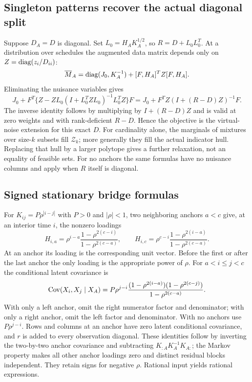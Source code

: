 \subsection{Singleton patterns recover the actual diagonal split}
Suppose $D_A=D$ is diagonal. Set $L_0=H_AK_A^{1/2}$, so
$R=D+L_0L_0^T$. At a distribution over schedules the augmented data
matrix depends only on $Z=\operatorname{diag}(z_i/D_{ii})$:
\[
 \overline M_A=\operatorname{diag}(J_0,K_A^{-1})+[F,H_A]^TZ[F,H_A].
\]
Eliminating the nuisance variables gives
\[
 J_0+F^T\{Z-ZL_0(I+L_0^TZL_0)^{-1}L_0^TZ\}F
 =J_0+F^TZ(I+(R-D)Z)^{-1}F.
\]
The inverse identity follows by multiplying by $I+(R-D)Z$ and is valid
at zero weights and with rank-deficient $R-D$. Hence the objective is the
virtual-noise extension for this exact $D$. For cardinality alone, the
marginals of mixtures over size-$k$ subsets fill $\mathcal Z_k$; more generally
they fill the actual indicator hull. Replacing that hull by a larger
polytope gives a further relaxation, not an equality of feasible sets.
For no anchors the same formulas have no nuisance columns and apply when
$R$ itself is diagonal.

\subsection{Signed stationary bridge formulas}
\label{app:stationary-bridges}
For $K_{ij}=P\rho^{|i-j|}$ with $P>0$ and $|\rho|<1$, two neighboring
anchors $a<c$ give, at an interior time $i$, the nonzero loadings
\begin{equation}\label{eq:bridge-loadings}
 H_{i,a}=\rho^{i-a}\frac{1-\rho^{2(c-i)}}{1-\rho^{2(c-a)}},\qquad
 H_{i,c}=\rho^{c-i}\frac{1-\rho^{2(i-a)}}{1-\rho^{2(c-a)}}.
\end{equation}
At an anchor its loading is the corresponding unit vector. Before the first
or after the last anchor the only loading is the appropriate power of
$\rho$. For $a<i\le j<c$ the conditional latent covariance is
\begin{equation}\label{eq:bridge-covariance}
 \operatorname{Cov}(X_i,X_j\mid X_A)
 =P\rho^{j-i}
 \frac{(1-\rho^{2(i-a)})(1-\rho^{2(c-j)})}{1-\rho^{2(c-a)}}.
\end{equation}
With only a left anchor, omit the right numerator factor and denominator;
with only a right anchor, omit the left factor and denominator. With no
anchors use $P\rho^{j-i}$. Rows and columns at an anchor have zero latent
conditional covariance, and $r$ is added to every observation diagonal.
These identities follow by inverting the two-by-two anchor covariance and
subtracting $K_{:A}K_A^{-1}K_{A:}$; the Markov property makes all other anchor
loadings zero and distinct residual blocks independent. They retain signs
for negative $\rho$. Rational input yields rational expressions.

